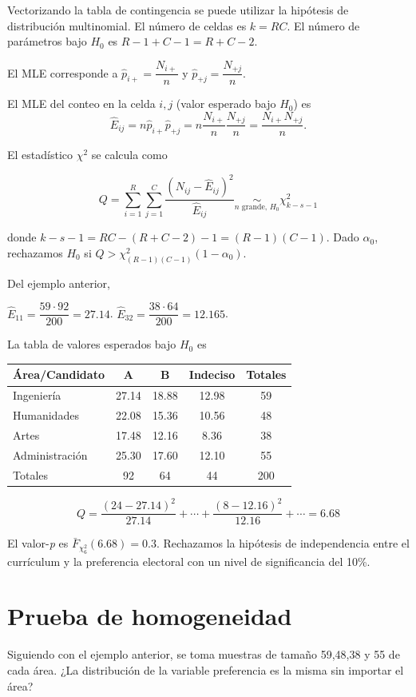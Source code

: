 \documentclass[
  12pt,
]{book}
\begin{document}
Vectorizando la tabla de contingencia se puede utilizar la hipótesis de distribución multinomial. El número de celdas es \(k=RC\). El número de parámetros bajo \(H_0\) es \(R-1+C-1 = R+C-2\).

El MLE corresponde a \(\hat p_{i+} = \dfrac{N_{i+}}{n}\) y \(\hat p_{+j} = \dfrac{N_{+j}}{n}\).

El MLE del conteo en la celda \(i,j\) (valor esperado bajo \(H_0\)) es
\[\hat E_{ij} = n\hat p_{i+} \hat p_{+j}  = n\dfrac{N_{i+}}{n}\dfrac{N_{+j}}{n} = \dfrac{N_{i+}N_{+j}}{n}.\]

El estadístico \(\chi^2\) se calcula como

\[Q = \sum_{i=1}^R\sum_{j=1}^C \dfrac{(N_{ij}-\hat E_{ij})^2}{\hat E_{ij}} \underset{n\text{ grande, }H_0}{\sim} \chi^2_{k-s-1}\]

donde \(k-s-1 = RC-(R+C-2)-1 = (R-1)(C-1).\) Dado \(\alpha_0\), rechazamos \(H_0\) si \(Q>\chi^2_{(R-1)(C-1)}(1-\alpha_0)\).

Del ejemplo anterior,

\(\hat E_{11} = \dfrac{59\cdot92}{200} = 27.14\).
\(\hat E_{32} = \dfrac{38\cdot64}{200} = 12.165\).

La tabla de valores esperados bajo \(H_0\) es

\begin{longtable}[]{@{}lcccc@{}}
\toprule
Área/Candidato & A & B & Indeciso & Totales\tabularnewline
\midrule
\endhead
Ingeniería & 27.14 & 18.88 & 12.98 & 59\tabularnewline
Humanidades & 22.08 & 15.36 & 10.56 & 48\tabularnewline
Artes & 17.48 & 12.16 & 8.36 & 38\tabularnewline
Administración & 25.30 & 17.60 & 12.10 & 55\tabularnewline
Totales & 92 & 64 & 44 & 200\tabularnewline
\bottomrule
\end{longtable}

\[Q = \dfrac{(24-27.14)^2}{27.14} + \cdots+\dfrac{(8-12.16)^2}{12.16}+\cdots = 6.68\]

El valor-\emph{p} es \(\bar F_{\chi^2_6}(6.68) = 0.3\). Rechazamos la hipótesis de independencia entre el currículum y la preferencia electoral con un nivel de significancia del 10\%.

\hypertarget{prueba-de-homogeneidad}{%
\section{Prueba de homogeneidad}\label{prueba-de-homogeneidad}}

Siguiendo con el ejemplo anterior, se toma muestras de tamaño 59,48,38 y 55 de cada área. ¿La distribución de la variable preferencia es la misma sin importar el área?
\end{document}

